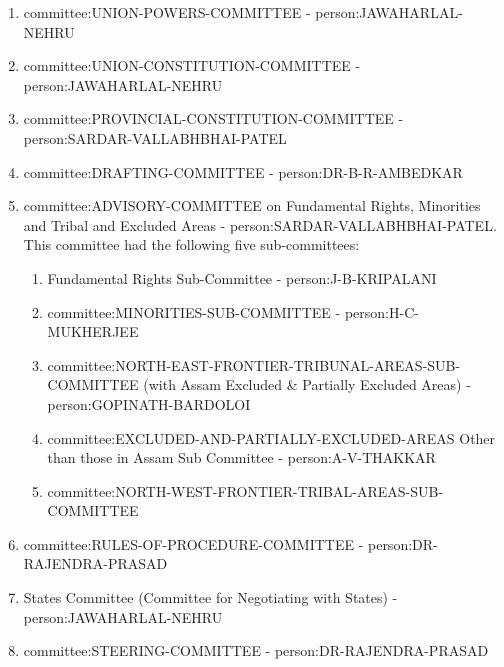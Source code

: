 \begin{multicol}{2}
\begin{enumerate}
  \item \gls{committee:UNION-POWERS-COMMITTEE} - \gls{person:JAWAHARLAL-NEHRU}
  \item \gls{committee:UNION-CONSTITUTION-COMMITTEE} - \gls{person:JAWAHARLAL-NEHRU}
  \item \gls{committee:PROVINCIAL-CONSTITUTION-COMMITTEE} - \gls{person:SARDAR-VALLABHBHAI-PATEL}
  \item \gls{committee:DRAFTING-COMMITTEE} - \gls{person:DR-B-R-AMBEDKAR}
  \item \gls{committee:ADVISORY-COMMITTEE} on Fundamental Rights, Minorities and Tribal and Excluded Areas - \gls{person:SARDAR-VALLABHBHAI-PATEL}. This committee had the following five sub-committees:
  \begin{enumerate}
    \item Fundamental Rights Sub-Committee - \gls{person:J-B-KRIPALANI}
    \item \gls{committee:MINORITIES-SUB-COMMITTEE} - \gls{person:H-C-MUKHERJEE}
    \item \gls{committee:NORTH-EAST-FRONTIER-TRIBUNAL-AREAS-SUB-COMMITTEE} (with Assam Excluded \& Partially Excluded Areas) - \gls{person:GOPINATH-BARDOLOI}
    \item \gls{committee:EXCLUDED-AND-PARTIALLY-EXCLUDED-AREAS} Other than those in Assam Sub Committee - \gls{person:A-V-THAKKAR}
    \item \gls{committee:NORTH-WEST-FRONTIER-TRIBAL-AREAS-SUB-COMMITTEE}
  \end{enumerate}

  \item \gls{committee:RULES-OF-PROCEDURE-COMMITTEE} - \gls{person:DR-RAJENDRA-PRASAD}
  \item States Committee (Committee for Negotiating with States) - \gls{person:JAWAHARLAL-NEHRU}
  \item \gls{committee:STEERING-COMMITTEE} - \gls{person:DR-RAJENDRA-PRASAD}
\end{enumerate}


\end{multicol}
